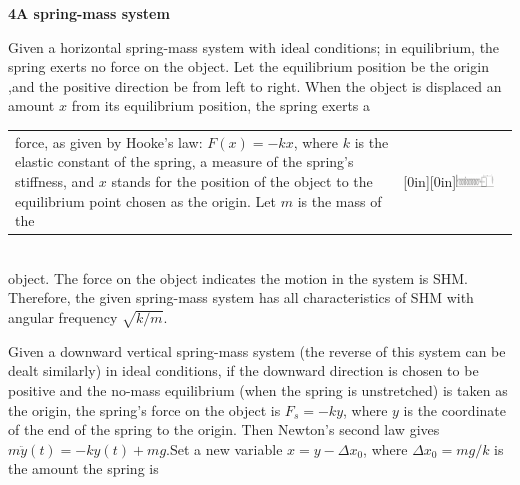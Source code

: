 \documentclass[a4paper,12pt,oneside]{report}
\newenvironment{tree}[4]{
\begin{list}{#1}{\parskip=0in \topsep=0in \itemsep=0in \parsep=0in \partopsep=0in \leftmargin=#2 \rightmargin=#3 \itemindent=#4 \listparindent=\itemindent}
}{\end{list}}
\newenvironment{ssection}[5]{
\phantom{#1}\textbf{#2\space#3}
\begin{tree}{#4}{0in}{0in}{#5}
}{\end{tree}}
\begin{document}
\begin{ssection}{\space}{4}{A spring-mass system}{\textbullet}{\parindent}
\item Given a horizontal spring-mass system with ideal conditions; in equilibrium, the spring exerts no force on the object. Let the equilibrium position be the origin ,and the positive direction be from left to right. When the object is displaced an amount $x$ from its equilibrium position, the spring exerts a\\
\begin{tabular}{p{}p{}}
force, as given by Hooke's law: $F(x)=-kx$, where $k$ is the elastic constant of the spring, a measure of the spring's stiffness, and $x$ stands for the position of the object to the equilibrium point chosen as the origin. Let $m$ is the mass of the&\raisebox{-48pt}[0in][0in]{\includegraphics[scale=1,width=0.375\textwidth]{figures/13Dec1.pdf}}
\end{tabular}\\
object. The force on the object indicates the motion in the system is SHM. Therefore, the given spring-mass system has all characteristics of SHM with angular frequency $\sqrt{k/m}$.
\item Given a downward vertical spring-mass system (the reverse of this system can be dealt similarly) in ideal conditions, if the downward direction is chosen to be positive and the no-mass equilibrium (when the spring is unstretched) is taken as the origin, the spring's force on the object is $F_{s}=-ky$, where $y$ is the coordinate of the end of the spring to the origin. Then Newton's second law gives $m\ddot{y}(t)=-ky(t)+mg$.Set a new variable $x=y-\Delta x_{0}$, where $\Delta x_{0}=mg/k$ is the amount the spring is\\
\begin{tabular}{p{}p{}}

\end{tabular}
\end{ssection}
\end{document}
